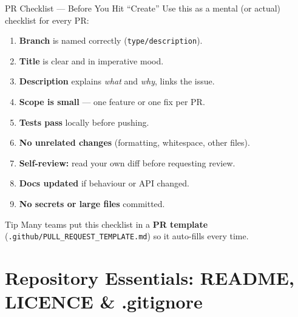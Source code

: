 \documentclass[aspectratio=169, 11pt]{beamer}
\begin{document}
\begin{frame}{PR Checklist --- Before You Hit ``Create''}
  Use this as a mental (or actual) checklist for every PR:

  \vspace{0.5em}
  \begin{enumerate}
    \item[\checkmark] \textbf{Branch} is named correctly (\texttt{type/description}).
    \item[\checkmark] \textbf{Title} is clear and in imperative mood.
    \item[\checkmark] \textbf{Description} explains \emph{what} and \emph{why}, links the issue.
    \item[\checkmark] \textbf{Scope is small} --- one feature or one fix per PR.
    \item[\checkmark] \textbf{Tests pass} locally before pushing.
    \item[\checkmark] \textbf{No unrelated changes} (formatting, whitespace, other files).
    \item[\checkmark] \textbf{Self-review:} read your own diff before requesting review.
    \item[\checkmark] \textbf{Docs updated} if behaviour or API changed.
    \item[\checkmark] \textbf{No secrets or large files} committed.
  \end{enumerate}

  \vspace{0.5em}
  \begin{block}{Tip}
    Many teams put this checklist in a \textbf{PR template} (\texttt{.github/PULL\_REQUEST\_TEMPLATE.md}) so it auto-fills every time.
  \end{block}
\end{frame}

\section{Repository Essentials: README, LICENCE \& .gitignore}
\end{document}

